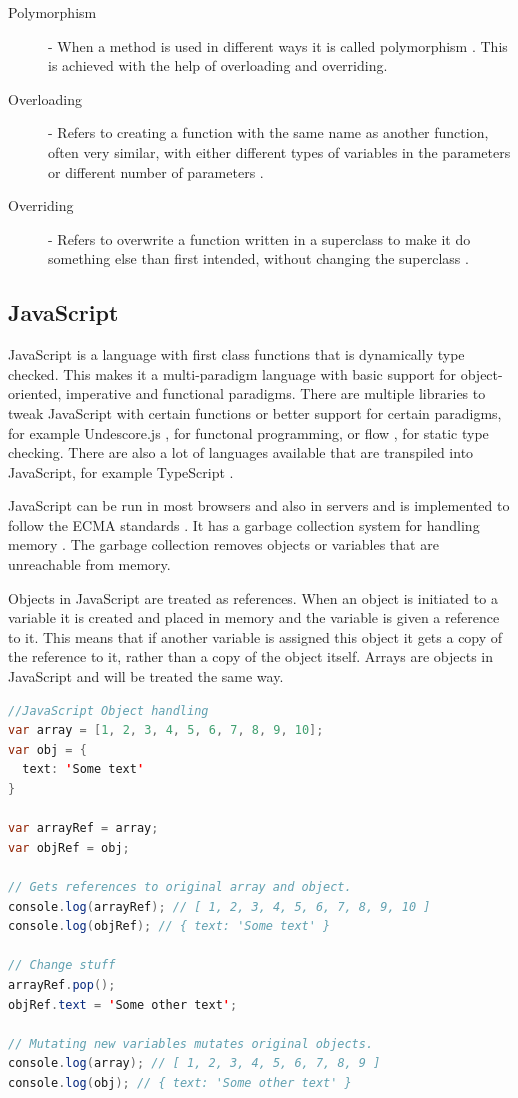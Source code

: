\documentclass {article}
\begin{document}
\begin{description}
\item [Polymorphism] - When a method is used in different ways it is called polymorphism \cite{gabmar, skansholm}. This is achieved with the help of overloading and overriding.

\item[Overloading] - Refers to creating a function with the same name as another function, often very similar, with either different types of variables in the parameters or different number of parameters \cite{skansholm}.

\item[Overriding] - Refers to overwrite a function written in a superclass to make it do something else than first intended, without changing the superclass \cite{skansholm}.
\end{description}
\subsection{JavaScript}
\label{sec:javascript}
JavaScript is a language with first class functions that is dynamically type checked. This makes it a multi-paradigm language with basic support for object-oriented, imperative and functional paradigms. There are multiple libraries to tweak JavaScript with certain functions or better support for certain paradigms, for example Undescore.js \cite{underscorejs}, for functonal programming, or flow \cite{flow}, for static type checking. There are also a lot of languages available that are transpiled into JavaScript, for example TypeScript \cite{typescript}. 

JavaScript can be run in most browsers and also in servers and is implemented to follow the ECMA standards \cite{ecma6table}. It has a garbage collection system for handling memory \cite{mozillamem}. The garbage collection removes objects or variables that are unreachable from memory. 

Objects in JavaScript are treated as references. When an object is initiated to a variable it is created and placed in memory and the variable is given a reference to it. This means that if another variable is assigned this object it gets a copy of the reference to it, rather than a copy of the object itself. Arrays are objects in JavaScript and will be treated the same way.

\begin{lstlisting}[language=Java, breaklines=true]
//JavaScript Object handling
var array = [1, 2, 3, 4, 5, 6, 7, 8, 9, 10];
var obj = {
  text: 'Some text'
}

var arrayRef = array;
var objRef = obj;

// Gets references to original array and object.
console.log(arrayRef); // [ 1, 2, 3, 4, 5, 6, 7, 8, 9, 10 ]
console.log(objRef); // { text: 'Some text' }

// Change stuff
arrayRef.pop();
objRef.text = 'Some other text';

// Mutating new variables mutates original objects.
console.log(array); // [ 1, 2, 3, 4, 5, 6, 7, 8, 9 ]
console.log(obj); // { text: 'Some other text' }
\end{lstlisting}
\end{document}
